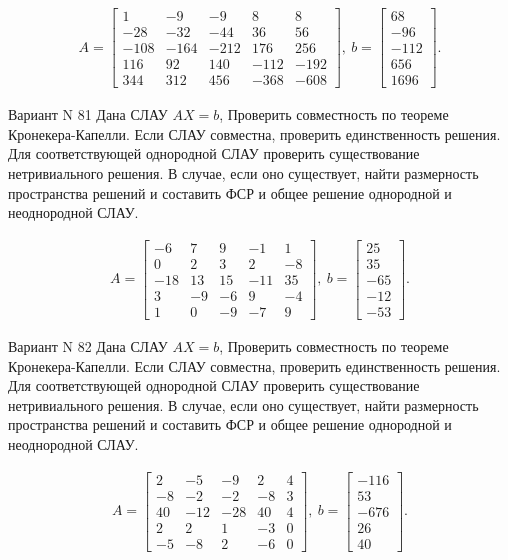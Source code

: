 \documentclass[11pt]{report}
\begin{document}
\begin{align*}
 A = \left[\begin{matrix}1 & -9 & -9 & 8 & 8\\-28 & -32 & -44 & 36 & 56\\-108 & -164 & -212 & 176 & 256\\116 & 92 & 140 & -112 & -192\\344 & 312 & 456 & -368 & -608\end{matrix}\right],
\ b = \left[\begin{matrix}68\\-96\\-112\\656\\1696\end{matrix}\right]. 
 \end{align*}

Вариант N 81
Дана СЛАУ $AX = b$,
Проверить совместность по теореме Кронекера-Капелли. Если СЛАУ совместна, проверить единственность решения.
Для соответствующей однородной СЛАУ проверить существование нетривиального решения. В случае, если оно существует,
найти размерность пространства решений и составить ФСР и общее решение однородной  и неоднородной СЛАУ.


\begin{align*}
 A = \left[\begin{matrix}-6 & 7 & 9 & -1 & 1\\0 & 2 & 3 & 2 & -8\\-18 & 13 & 15 & -11 & 35\\3 & -9 & -6 & 9 & -4\\1 & 0 & -9 & -7 & 9\end{matrix}\right],
\ b = \left[\begin{matrix}25\\35\\-65\\-12\\-53\end{matrix}\right]. 
 \end{align*}

Вариант N 82
Дана СЛАУ $AX = b$,
Проверить совместность по теореме Кронекера-Капелли. Если СЛАУ совместна, проверить единственность решения.
Для соответствующей однородной СЛАУ проверить существование нетривиального решения. В случае, если оно существует,
найти размерность пространства решений и составить ФСР и общее решение однородной  и неоднородной СЛАУ.


\begin{align*}
 A = \left[\begin{matrix}2 & -5 & -9 & 2 & 4\\-8 & -2 & -2 & -8 & 3\\40 & -12 & -28 & 40 & 4\\2 & 2 & 1 & -3 & 0\\-5 & -8 & 2 & -6 & 0\end{matrix}\right],
\ b = \left[\begin{matrix}-116\\53\\-676\\26\\40\end{matrix}\right]. 
 \end{align*}
\end{document}

